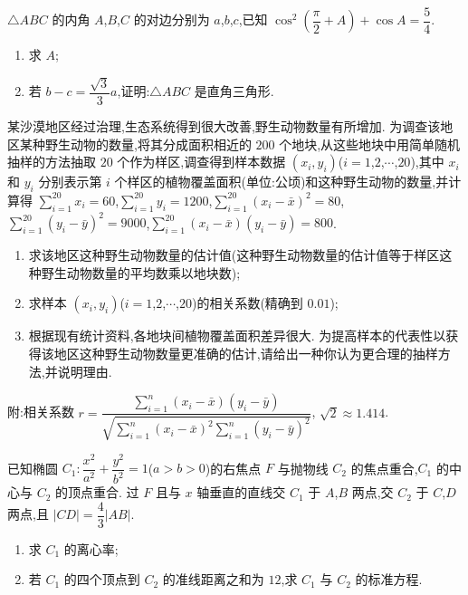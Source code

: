 \begin{problem}
\(\triangle ABC\) 的内角 \(A\),\(B\),\(C\) 的对边分别为 \(a\),\(b\),\(c\),已知 \(\cos^2\left( \dfrac{\pi}{2}+A \right)+\cos A=\dfrac{5}{4}\).

\begin{enumerate}
\item 求 \(A\);
\item 若 \(b-c=\dfrac{\sqrt3}{3}a\),证明:\(\triangle ABC\) 是直角三角形.
\end{enumerate}
\end{problem}

\begin{problem}
某沙漠地区经过治理,生态系统得到很大改善,野生动物数量有所增加. 为调查该地区某种野生动物的数量,将其分成面积相近的 \(200\) 个地块,从这些地块中用简单随机抽样的方法抽取 \(20\) 个作为样区,调查得到样本数据 \((x_i,y_i)\)(\(i=1\),\(2\),\(\cdots\),\(20\)),其中 \(x_i\) 和 \(y_i\) 分别表示第 \(i\) 个样区的植物覆盖面积(单位:公顷)和这种野生动物的数量,并计算得 \(\sum_{i=1}^{20}x_i=60\),\(\sum_{i=1}^{20}y_i=1200\),\(\sum_{i=1}^{20}(x_i-\bar x)^2=80\),\(\sum_{i=1}^{20}(y_i-\bar y)^2=9000\),\(\sum_{i=1}^{20}(x_i-\bar x)(y_i-\bar y)=800\).

\begin{enumerate}
\item 求该地区这种野生动物数量的估计值(这种野生动物数量的估计值等于样区这种野生动物数量的平均数乘以地块数);
\item 求样本 \((x_i,y_i)\)(\(i=1\),\(2\),\(\cdots\),\(20\))的相关系数(精确到 \(0.01\));
\item 根据现有统计资料,各地块间植物覆盖面积差异很大. 为提高样本的代表性以获得该地区这种野生动物数量更准确的估计,请给出一种你认为更合理的抽样方法,并说明理由.
\end{enumerate}

附:相关系数
\(r=\dfrac{\sum_{i=1}^{n}(x_i-\bar x)(y_i-\bar y)}{\sqrt{\sum_{i=1}^{n}(x_i-\bar x)^2\sum_{i=1}^{n}(y_i-\bar y)^2}}\),
\(\sqrt2\approx 1.414\).
\end{problem}

\begin{problem}
已知椭圆 \(C_1:\dfrac{x^2}{a^2}+\dfrac{y^2}{b^2}=1\)(\(a>b>0\))的右焦点 \(F\) 与抛物线 \(C_2\) 的焦点重合,\(C_1\) 的中心与 \(C_2\) 的顶点重合. 过 \(F\) 且与 \(x\) 轴垂直的直线交 \(C_1\) 于 \(A\),\(B\) 两点,交 \(C_2\) 于 \(C\),\(D\) 两点,且 \(\lvert CD\rvert=\dfrac{4}{3}\lvert AB\rvert\).

\begin{enumerate}
\item 求 \(C_1\) 的离心率;
\item 若 \(C_1\) 的四个顶点到 \(C_2\) 的准线距离之和为 \(12\),求 \(C_1\) 与 \(C_2\) 的标准方程.
\end{enumerate}
\end{problem}

